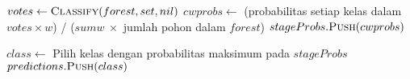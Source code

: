 \begin{center}
\begin{algorithmic}[1]
			\State $ votes \gets \Call{Classify}{forest, set, nil} $
			\State $ cwprobs \gets $
				(probabilitas setiap kelas dalam $votes \times w$) /
				($ sumw ~ \times $ jumlah pohon dalam $forest$)
			\State $ stageProbs.\Call{Push}{cwprobs} $
		\EndFor

		\State $ class \gets $ Pilih kelas dengan probabilitas maksimum pada $stageProbs$
		\State $ predictions.\Call{Push}{class} $
	\EndFor
	\\
	\State {}
\EndFunction
	\end{algorithmic}
\end{center}
